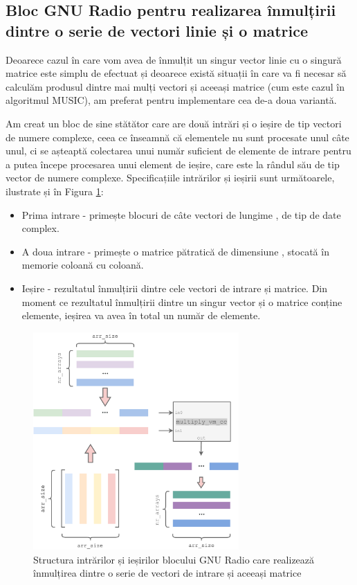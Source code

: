 \subsection{Bloc GNU Radio pentru realizarea înmulțirii dintre o serie de
vectori linie și o matrice}

Deoarece cazul în care vom avea de înmulțit un singur vector linie cu o singură
matrice este simplu de efectuat și deoarece există situații în care va fi necesar să
calculăm produsul dintre mai mulți vectori și aceeași matrice (cum este cazul în
algoritmul MUSIC), am preferat pentru implementare cea de-a doua variantă.

Am creat un bloc de sine stătător care are două
intrări și o ieșire de tip vectori de numere complexe, ceea ce înseamnă că
elementele nu sunt procesate unul câte unul, ci se așteaptă colectarea unui număr
suficient de elemente de intrare pentru a putea începe procesarea unui element
de ieșire, care este la rândul său de tip vector de numere complexe.
Specificațiile intrărilor și ieșirii sunt următoarele, ilustrate și în Figura
\ref{fig:multiply-cc}:
\begin{itemize}
  \item Prima intrare - primește blocuri de câte  vectori de
  lungime , de tip de date complex.

  \item A doua intrare  - primește o matrice pătratică de dimensiune , stocată în memorie coloană cu coloană.

  \item Ieșire - rezultatul înmulțirii dintre cele  vectori de
  intrare și matrice. Din moment ce rezultatul înmulțirii dintre un singur
  vector și o matrice conține  elemente, ieșirea va avea în
  total un număr de  elemente.
\end{itemize}

\begin{figure}[h]
    \centering
    \includegraphics[width=0.7\textwidth]{src/img/multiply-cc}
    \caption{Structura intrărilor și ieșirilor blocului GNU Radio care
    realizează înmulțirea dintre o serie de vectori de intrare și aceeași
    matrice}
    \label{fig:multiply-cc}
\end{figure}

